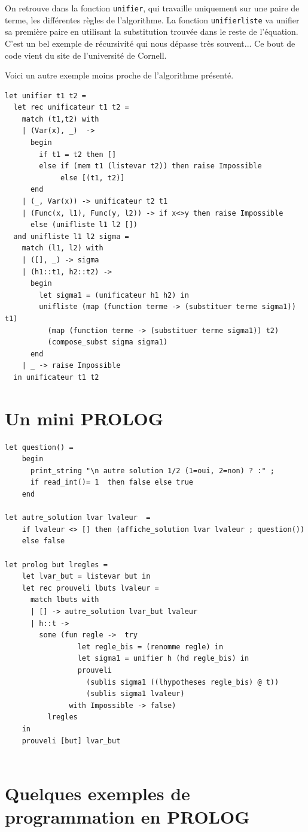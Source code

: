 \documentclass[11pt]{book}
\begin{document}
On retrouve dans la fonction \verb+unifier+, qui travaille uniquement sur une paire de terme, les différentes règles
de l'algorithme. La fonction \verb+unifierliste+ va unifier sa première paire en utilisant la substitution trouvée dans le reste
de l'équation. C'est un bel exemple de récursivité qui nous dépasse très souvent... 
Ce bout de code vient du site de l'université de Cornell.

Voici un autre exemple moins proche de l'algorithme présenté.
\begin{Verbatim}
let unifier t1 t2 =
  let rec unificateur t1 t2 =
    match (t1,t2) with
    | (Var(x), _)  -> 
      begin
        if t1 = t2 then [] 
        else if (mem t1 (listevar t2)) then raise Impossible
             else [(t1, t2)]
      end		  
    | (_, Var(x)) -> unificateur t2 t1
    | (Func(x, l1), Func(y, l2)) -> if x<>y then raise Impossible
      else (unifliste l1 l2 [])
  and unifliste l1 l2 sigma =
    match (l1, l2) with
    | ([], _) -> sigma
    | (h1::t1, h2::t2) ->
      begin
        let sigma1 = (unificateur h1 h2) in
        unifliste (map (function terme -> (substituer terme sigma1)) t1)
          (map (function terme -> (substituer terme sigma1)) t2)
          (compose_subst sigma sigma1)
      end		
    | _ -> raise Impossible
  in unificateur t1 t2 
\end{Verbatim}


\section{Un mini PROLOG}
\begin{Verbatim}
let question() =
	begin
	  print_string "\n autre solution 1/2 (1=oui, 2=non) ? :" ;
	  if read_int()= 1  then false else true 
	end
  
let autre_solution lvar lvaleur  =
	if lvaleur <> [] then (affiche_solution lvar lvaleur ; question())
	else false 
  
let prolog but lregles =
	let lvar_but = listevar but in
	let rec prouveli lbuts lvaleur =
	  match lbuts with
	  | [] -> autre_solution lvar_but lvaleur
	  | h::t -> 
		some (fun regle ->  try
				 let regle_bis = (renomme regle) in
				 let sigma1 = unifier h (hd regle_bis) in			
				 prouveli 
				   (sublis sigma1 ((lhypotheses regle_bis) @ t))
				   (sublis sigma1 lvaleur)  
			   with Impossible -> false)
		  lregles 
	in
	prouveli [but] lvar_but
  
\end{Verbatim}

\section{Quelques exemples de programmation en PROLOG}
\end{document}
